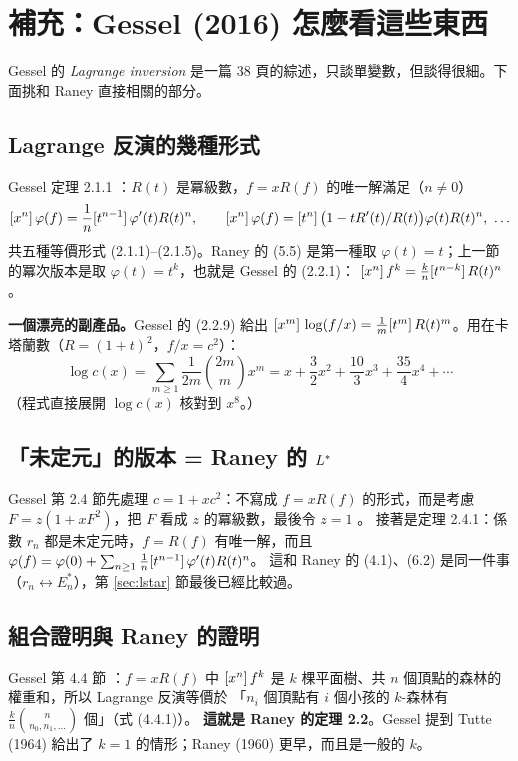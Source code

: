 \section{補充：Gessel (2016) 怎麼看這些東西}\label{sec:gessel}

Gessel 的 \emph{Lagrange inversion} 是一篇 38 頁的綜述，只談單變數，但談得很細。下面挑和 Raney 直接相關的部分。

\subsection{Lagrange 反演的幾種形式}

Gessel 定理 2.1.1 ：$R(t)$ 是冪級數，$f=xR(f)$ 的唯一解滿足（$n\neq0$）
\[
\coef{x^n}\varphi(f)=\frac1n\coef{t^{n-1}}\varphi'(t)R(t)^n,\qquad
\coef{x^n}\varphi(f)=\coef{t^n}\big(1-tR'(t)/R(t)\big)\varphi(t)R(t)^n,\ \ldots
\]
共五種等價形式 (2.1.1)--(2.1.5)。Raney 的 (5.5) 是第一種取 $\varphi(t)=t$；上一節的冪次版本是取 $\varphi(t)=t^k$，也就是 Gessel 的 (2.2.1)：
$[x^n]\,f^k=\frac kn[t^{n-k}]\,R(t)^n$。

\textbf{一個漂亮的副產品。}Gessel 的 (2.2.9) 給出 $[x^m]\,\log(f/x)=\frac1m[t^m]\,R(t)^m$。用在卡塔蘭數（$R=(1+t)^2$，$f/x=c^2$）：
\[
\log c(x)=\sum_{m\ge1}\frac{1}{2m}\binom{2m}{m}x^m=x+\frac32x^2+\frac{10}3x^3+\frac{35}4x^4+\cdots
\]
（程式直接展開 $\log c(x)$ 核對到 $x^8$。）

\subsection{「未定元」的版本 = Raney 的 $L^{*}$}

Gessel 第 2.4 節先處理 $c=1+xc^2$：不寫成 $f=xR(f)$ 的形式，而是考慮 $F=z(1+xF^2)$，把 $F$ 看成 $z$ 的冪級數，最後令 $z=1$ 。
接著是定理 2.4.1：係數 $r_n$ 都是未定元時，$f=R(f)$ 有唯一解，而且
$\varphi(f)=\varphi(0)+\sum_{n\ge1}\frac1n[t^{n-1}]\,\varphi'(t)R(t)^n$。
這和 Raney 的 (4.1)、(6.2) 是同一件事（$r_n\leftrightarrow E_n^*$），第 \ref{sec:lstar} 節最後已經比較過。

\subsection{組合證明與 Raney 的證明}

Gessel 第 4.4 節 ：$f=xR(f)$ 中 $[x^n]\,f^k$ 是 $k$ 棵平面樹、共 $n$ 個頂點的森林的權重和，所以 Lagrange 反演等價於
「$n_i$ 個頂點有 $i$ 個小孩的 $k$-森林有 $\frac kn\binom{n}{n_0,n_1,\ldots}$ 個」（式 (4.4.1)）。
\textbf{這就是 Raney 的定理 2.2}。Gessel 提到 Tutte (1964) 給出了 $k=1$ 的情形；Raney (1960) 更早，而且是一般的 $k$。

